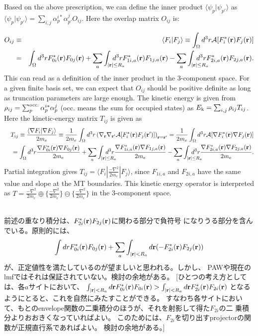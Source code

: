 \documentclass[twocolumn,showpacs,preprintnumbers,amsmath,amssymb,floatfix]{revtex4-1}
\newcommand{\bfr}{{\bf r}}
\def\calR{{\cal A}}
\def\inta{\int_{|\bfr|\leq R_a}\!\!\!\!\!\!\!\!\!\!\!\!}
\def\ek{E_{\rm k}}
\begin{document}
Based on the above prescription, we can define the inner product 
$\langle \psi_p |\psi_{p'} \rangle$ as $\langle \psi_p |\psi_{p'}
\rangle=\sum_{i,j}\alpha_{p}^{i*}\alpha_{p'}^{j}O_{ij}$.
Here the overlap matrix  $O_{ij}$ is:
\begin{widetext}
\begin{eqnarray}
O_{ij} &\equiv& \langle F_i|F_{j} \rangle \equiv \int_\Omega d^3r 
  \calR[F^*_i(\bfr)F_j(\bfr)] \nonumber \\
&=&\int_\Omega d^3r  F^*_{0i}(\bfr)F_{0j}(\bfr)
  + \sum_a \inta d^3r  F^*_{1i,a}(\bfr)F_{1j,a}(\bfr) 
  - \sum_a \inta d^3r  F^*_{2i,a}(\bfr)F_{2j,a}(\bfr).  \label{eq:norm} 
\end{eqnarray}
This can read as a definition of the inner product in the 3-component space.
For a given finite basis set, we can expect that $O_{ij}$ should be
positive definite as long as truncation parameters are large enough.
The kinetic energy is given 
from $\rho_{ij}=\sum_{p}^{\rm occ.} \alpha^{i*}_p \alpha^j_p$ (occ. means
the sum for occupied states) as $\ek=\sum_{i,j} \rho_{ij} T_{ij}$.
Here the kinetic-energy matrix $T_{ij}$ is given as
\begin{eqnarray}
&&T_{ij}\equiv \frac{\langle \nabla F_i| \nabla F_{j} \rangle}{2m_e}
 \equiv \frac{1}{2m_e} \int_\Omega d^3r \left(\nabla_\bfr \nabla_{\bfr'}
 \calR[F^*_i(\bfr)F_j(\bfr')]\right)_{\bfr=\bfr'} 
=\frac{1}{2m_e} \int_\Omega d^3r 
\calR[\nabla F^*_i(\bfr) \nabla F_j(\bfr)] \nonumber \\
&&= \int_\Omega d^3r \frac{\nabla F^*_{0i}(\bfr) \nabla F_{0j}(\bfr)}{2m_e} 
+ \sum_a \inta d^3r \frac{\nabla F^*_{1i,a}(\bfr) \nabla F_{1j,a}(\bfr)}{2m_e}
- \sum_a \inta d^3r \frac{\nabla F^*_{2i,a}(\bfr) \nabla F_{2j,a}(\bfr)}{2m_e}.
\label{eq:kin}
\end{eqnarray}
Partial integration gives $T_{ij}= \langle F_i| \frac{-\nabla^2 }{2m_e}|F_{j} \rangle$, 
since $F_{1i,a}$ and $F_{2i,a}$ have the same value and slope at the MT boundaries.
This kinetic energy operator is interpreted as $T=\frac{-\nabla^2 }{2m_e} \oplus
\{\frac{-\nabla^2 }{2m_e} \} \ominus  \{\frac{-\nabla^2 }{2m_e} \}$ in the 3-component space.

{\small 
{}\\
前述の重なり積分は、$F^{*}_{2i}(\bfr) F_{2j}(\bfr)$に関わる部分で負符号
になりうる部分を含んでいる。原則的には、
\begin{eqnarray}
\int dr F^*_{0i}(\bfr) F_{0j}(\bfr)  
+ \sum_a \int_{|\bfr| <R_a} d\bfr ( - F^{*}_{2i}(\bfr) F_{2j}(\bfr)) \nonumber 
\label{eq:over2}
\end{eqnarray}
が、正定値性を満たしているのが望ましいと思われる。しかし、
PAWや現在のlmfではそれは保証されていない。検討の余地がある。
[ひとつの考え方としては、各$a$サイトにおいて、
$\int_{|\bfr| <R_a} d\bfr F^*_{0i}(\bfr) F_{0i}(\bfr)  
>\int_{|\bfr| <R_a} d\bfr F^{*}_{2i}(\bfr) F_{2i}(\bfr)$ 
となるようにとると、これを自然にみたすことができる。
すなわち各サイトにおいて、もとのenvelope関数の二乗積分のほうが、それを射影して得た$F_{2i}$の二
乗積分よりおおきくなっていればよい。
このためには、$F_{2i}$を切り出すprojectorの関数が正規直行系であればよい。
検討の余地がある。]
}


\end{widetext}
\end{document}

